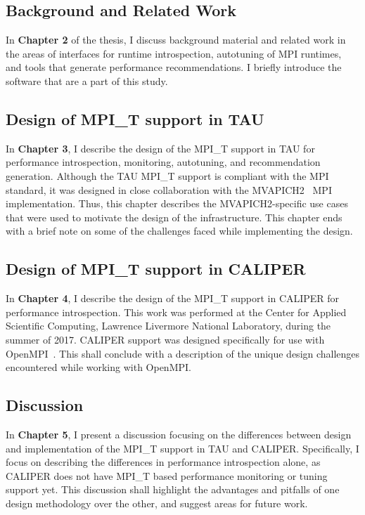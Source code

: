 \subsection {Background and Related Work}
In \textbf{Chapter 2} of the thesis, I discuss background material and related work in the areas of interfaces for runtime introspection, autotuning of MPI runtimes, and tools that generate performance recommendations. I briefly introduce the  software that are a part of this study.

\subsection {Design of MPI\_T support in TAU}
In \textbf{Chapter 3}, I describe the design of the MPI\_T support in TAU for performance introspection, monitoring, autotuning, and recommendation generation. Although the TAU MPI\_T support is compliant with the MPI standard, it was designed in close collaboration with the MVAPICH2~\cite{MVAPICH2} MPI implementation. Thus, this chapter describes the MVAPICH2-specific use cases that were used to motivate the design of the infrastructure. This chapter ends with a brief note on some of the challenges faced while implementing the design.

\subsection {Design of MPI\_T support in CALIPER}
In \textbf{Chapter 4}, I describe the design of the MPI\_T support in CALIPER for performance introspection. This work was performed at the Center for Applied Scientific Computing, Lawrence Livermore National Laboratory, during the summer of 2017. CALIPER support was designed specifically for use with OpenMPI~\cite{OpenMPI}. This shall conclude with a description of the unique design challenges encountered while working with OpenMPI.

\subsection {Discussion}
In \textbf{Chapter 5}, I present a discussion focusing on the differences between design and implementation of the MPI\_T support in TAU and CALIPER. Specifically, I focus on describing the differences in performance introspection alone, as CALIPER does not have MPI\_T based performance monitoring or tuning support yet. This discussion shall highlight the advantages and pitfalls of one design methodology over the other, and suggest areas for future work. 

